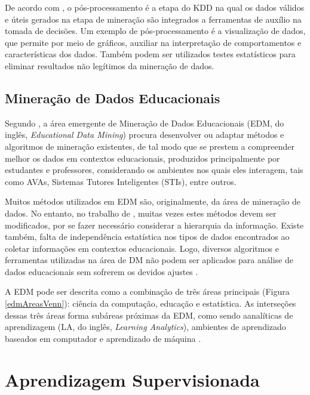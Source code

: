 De acordo com , o pós-processamento é a etapa do
KDD na qual os dados válidos e úteis gerados na etapa de mineração são
integrados a ferramentas de auxílio na tomada de decisões. Um exemplo de
pós-processamento é a visualização de dados, que permite por meio de gráficos,
auxiliar na interpretação de comportamentos e características dos dados. Também
podem ser utilizados testes estatísticos para eliminar resultados não legítimos
da mineração de dados.

\subsection{Mineração de Dados Educacionais}

Segundo , a área emergente de Mineração de Dados
Educacionais (EDM, do inglês, \textit{Educational Data Mining}) procura
desenvolver ou adaptar métodos e algoritmos de mineração existentes, de tal modo
que se prestem a compreender melhor os dados em contextos educacionais,
produzidos principalmente por estudantes e professores, considerando os
ambientes nos quais eles interagem, tais como AVAs, Sistemas Tutores
Inteligentes (STIs), entre outros.

Muitos métodos utilizados em EDM são, originalmente, da área de mineração de
dados. No entanto, no trabalho de , muitas vezes estes
métodos devem ser modificados, por se fazer necessário considerar a hierarquia
da informação. Existe também, falta de independência estatística nos tipos de
dados encontrados ao coletar informações em contextos educacionais. Logo,
diversos algoritmos e ferramentas utilizadas na área de DM não podem ser
aplicados para análise de dados educacionais sem sofrerem os devidos ajustes
\cite{baker2011mineraccao,costa2012mineraccao}.

A EDM pode ser descrita como a combinação de três áreas principais (Figura
\ref{edmAreasVenn}): ciência da computação, educação e estatística. As
interseções dessas três áreas forma subáreas próximas da EDM, como sendo
aanalíticas de aprendizagem (LA, do inglês, \textit{Learning Analytics}),
ambientes de aprendizado baseados em computador e aprendizado de máquina
\cite{romero2013data}.


\section{Aprendizagem Supervisionada}

